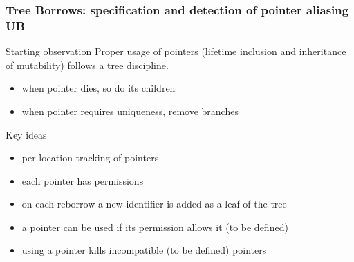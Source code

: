 \begin{frame}[t]
    \frametitle{Tree Borrows: specification and detection of pointer aliasing UB}
    \begin{alertblock}{Starting observation}
        Proper usage of pointers (lifetime inclusion and inheritance of mutability) follows a tree discipline.
        \begin{itemize}
            \item when pointer dies, so do its children
            \item when pointer requires uniqueness, remove branches
        \end{itemize}
    \end{alertblock}
    \begin{block}{Key ideas}
        \begin{itemize}
            \item per-location tracking of pointers
            \item each pointer has permissions
            \item on each reborrow a new identifier is added as a leaf of the tree
            \item a pointer can be used if its permission allows it (to be defined)
            \item using a pointer kills incompatible (to be defined) pointers
        \end{itemize}
    \end{block}
\end{frame}

